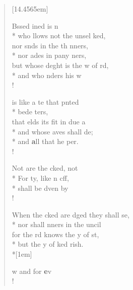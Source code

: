 \begin{flushleft}
\begin{verse}[14.4565em]

 Bssed ined is  n\\*
who llows not the unsel   ked,\\
nor snds in the th  nners,\\*
nor ades in  pany  ners,\\
 but whose deght is the w of  rd,\\*
and who nders his w   \\!

  is like a te that  pnted\\*
bede   ters,\\
that elds its fit in due a\flagflex{\dag}\\*
and whose aves shall  de;\\*
and \textbf{a}ll that he   per.\\!

 Not  are the cked, not \flagflex{\dag}\\*
For ty, like n cff,\\*
shall be dven  by  \\!

 When the cked are dged they shall  se,\\*
nor shall nners in the uncil   \\
 for the rd knows the y of  st,\\*
but the y of  ked  rish.\\*[1em]

w and for \textbf{e}v \\!
\end{verse}
\end{flushleft}
